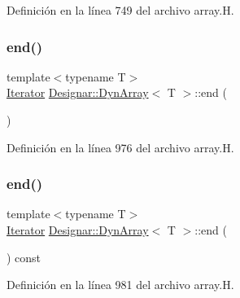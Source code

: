 Definición en la línea 749 del archivo array.\+H.

\mbox{\label{class_designar_1_1_dyn_array_a1a6bfcf9c4cd8d54138339b9313661f3}} 
\subsubsection{\texorpdfstring{end()}{end()}\hspace{0.1cm}{\footnotesize\ttfamily [1/2]}}
{\footnotesize\ttfamily template$<$typename T$>$ \\
\hyperlink{class_designar_1_1_dyn_array_1_1_iterator}{Iterator} \hyperlink{class_designar_1_1_dyn_array}{Designar\+::\+Dyn\+Array}$<$ T $>$\+::end (\begin{DoxyParamCaption}{ }\end{DoxyParamCaption})\hspace{0.3cm}{\ttfamily [inline]}}



Definición en la línea 976 del archivo array.\+H.

\mbox{\label{class_designar_1_1_dyn_array_ab2ff81ff5bfeefbcd0a302da9effff89}} 
\subsubsection{\texorpdfstring{end()}{end()}\hspace{0.1cm}{\footnotesize\ttfamily [2/2]}}
{\footnotesize\ttfamily template$<$typename T$>$ \\
\hyperlink{class_designar_1_1_dyn_array_1_1_iterator}{Iterator} \hyperlink{class_designar_1_1_dyn_array}{Designar\+::\+Dyn\+Array}$<$ T $>$\+::end (\begin{DoxyParamCaption}{ }\end{DoxyParamCaption}) const\hspace{0.3cm}{\ttfamily [inline]}}



Definición en la línea 981 del archivo array.\+H.

\mbox{\label{class_designar_1_1_dyn_array_afa027281e5790d05269d5972ec2ea177}} 
